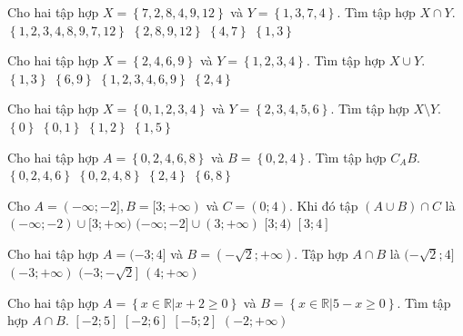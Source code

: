 \begin{ex}%
	Cho hai tập hợp $X=\left\{ 7, 2, 8, 4, 9, 12 \right\}$ và $Y=\left\{ 1, 3, 7, 4 \right\}$. Tìm tập hợp $X\cap Y$.
	\choice
	{$\left\{ 1, 2, 3, 4, 8, 9, 7, 12 \right\}$}
	{$\left\{ 2, 8, 9, 12 \right\}$}
	{\True $\left\{ 4, 7 \right\}$}
	{$\left\{ 1, 3 \right\}$}
\end{ex}
\begin{ex}%
	Cho hai tập hợp $X=\left\{ 2, 4, 6, 9 \right\}$ và $Y=\left\{ 1, 2, 3, 4 \right\}$. Tìm tập hợp $X \cup Y$.
	\choice
	{$\left\{1, 3 \right\}$	}
	{$\left\{6, 9 \right\}$}
	{\True $\left\{1, 2, 3, 4, 6, 9 \right\}$}
	{$\left\{2, 4 \right\}$}
\end{ex}
\begin{ex}%
	Cho hai tập hợp $X=\left\{0, 1, 2, 3, 4\right\}$ và $Y=\left\{ 2, 3, 4, 5, 6 \right\}$. Tìm tập hợp $X\setminus Y$.
	\choice
	{$\left\{ 0 \right\}$}
	{\True $\left\{ 0, 1 \right\}$}
	{$\left\{ 1, 2 \right\}$}
	{$\left\{ 1, 5 \right\}$}
\end{ex}
\begin{ex}%
	Cho hai tập hợp $A = \left\{0, 2, 4, 6, 8\right\}$ và $B = \left\{0, 2, 4\right\}$. Tìm tập hợp $C_{A}B$.
	\choice
	{$\left\{0, 2, 4, 6\right\}$}
	{$\left\{0, 2, 4, 8\right\}$}
	{$\left\{2, 4\right\}$}
	{\True $\left\{6, 8\right\}$}
\end{ex}
\begin{ex}%
	Cho $A=(-\infty;-2], B=[3;+\infty)$ và $C=(0;4)$. Khi đó tập $(A\cup B)\cap C$ là
	\choice
	{$(-\infty;-2)\cup[3;+\infty)$}
	{$(-\infty;-2]\cup (3;+\infty)$}
	{\True $[3;4)$}
	{$[3;4]$}
	\loigiai{
		$(A\cup B)=(-\infty;-2]\cup [3;+\infty)$.\\
		Vậy $(A\cup B)\cap C =[3;4)$.
	}
\end{ex}
\begin{ex}%
	Cho hai tập hợp $A=(-3;4]$ và $B=(-\sqrt 2;+\infty)$. Tập hợp $A\cap B$ là
	\choice
	{\True $(-\sqrt 2;4]$}
	{$(-3;+\infty)$}
	{$(-3;-\sqrt 2]$}
	{$(4;+\infty)$}
	\loigiai{
		Ta có $A\cap B=(-\sqrt 2;4]$.
	}
\end{ex}
\begin{ex}%
	Cho hai tập hợp $A=\left\{ x\in \mathbb{R}\big|x+2\geq 0 \right\}$ và $B=\left\{ x\in \mathbb{R}\big|5-x\geq 0 \right\}$. Tìm tập hợp $A\cap B$. 
	\choice
	{\True $\left[ -2;5 \right]$}
	{$\left[ -2;6 \right]$}
	{$\left[ -5;2 \right]$}
	{$\left( -2;+\infty  \right)$}
\end{ex}
